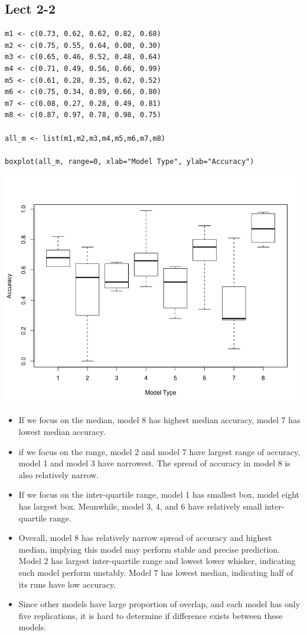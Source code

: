 \documentclass[11pt,letterpaper]{article}
\begin{document}
\subsection*{Lect 2-2}
\begin{verbatim}
m1 <- c(0.73, 0.62, 0.62, 0.82, 0.68)
m2 <- c(0.75, 0.55, 0.64, 0.00, 0.30)
m3 <- c(0.65, 0.46, 0.52, 0.48, 0.64)
m4 <- c(0.71, 0.49, 0.56, 0.66, 0.99)
m5 <- c(0.61, 0.28, 0.35, 0.62, 0.52)
m6 <- c(0.75, 0.34, 0.89, 0.66, 0.80)
m7 <- c(0.08, 0.27, 0.28, 0.49, 0.81)
m8 <- c(0.87, 0.97, 0.78, 0.98, 0.75)

all_m <- list(m1,m2,m3,m4,m5,m6,m7,m8)

boxplot(all_m, range=0, xlab="Model Type", ylab="Accuracy")
\end{verbatim}

\includegraphics[scale=0.45]{lec-2-2.png}

\begin{itemize}
\item If we focus on the median, model 8 has highest median accuracy, model 7 has lowest median accuracy. 
\item if we focus on the range, model 2 and model 7 have largest range of accuracy, model 1 and model 3 have narrowest. The spread of accuracy in model 8 is also relatively narrow. 
\item If we focus on the inter-quartile range, model 1 has smallest box, model eight has largest box. Meanwhile, model 3, 4, and 6 have relatively small inter-quartile range. 
\item Overall, model 8 has relatively narrow spread of accuracy and highest median, implying this model may perform stable and precise prediction. Model 2 has largest inter-quartile range and lowest lower whisker, indicating such model perform unstably. Model 7 has lowest median, indicating half of its runs have low accuracy. 
\item Since other models have large proportion of overlap, and each model has only five replications, it is hard to determine if difference exists between these models. 
\end{itemize}
\end{document}
